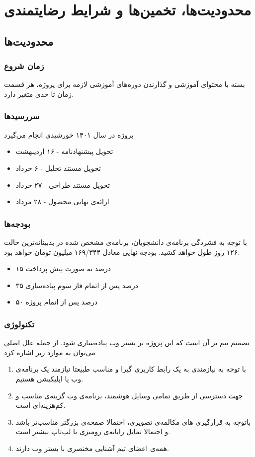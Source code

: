 \section{محدودیت‌ها، تخمین‌ها و شرایط رضایتمندی}

\subsection{محدودیت‌ها}
\subsubsection{زمان شروع}
بسته با محتوای آموزشی و گذارندن دوره‌های آموزشی لازمه برای پروژه، هر قسمت زمان تا حدی متغیر دارد.
\subsubsection{سررسید‌ها}
پروژه در سال ۱۴۰۱ خورشیدی انجام می‌گیرد
\begin{itemize}
    \item تحویل پیشنهادنامه - ۱۶ اردیبهشت
    \item تحویل مستند تحلیل - ۶ خرداد
    \item تحویل مستند طراحی - ۲۷ خرداد
    \item ارائه‌ی نهایی محصول - ۲۸ مرداد
\end{itemize}
\subsubsection{بودجه‌ها}
با توجه به فشردگی برنامه‌ی دانشجویان، برنامه‌ی مشخص شده در بدبینانه‌ترین حالت ۱۲۶ روز طول خواهد کشید. بودجه نهایی معادل ۱۶۹/۳۴۴ میلیون تومان خواهد بود.
\begin{itemize}
    \item ۱۵ درصد به صورت پیش پرداخت
    \item ۳۵ درصد پس از اتمام فاز سوم پیاده‌سازی
    \item ۵۰ درصد پس از اتمام پروژه
\end{itemize}
\subsubsection{تکنولوژی}
تصمیم تیم بر آن است که این پروژه بر بستر وب پیاده‌سازی شود. از جمله علل اصلی می‌توان به موارد زیر اشاره کرد
\begin{enumerate}
    \item با توجه به نیازمندی به یک رابط کاربری گیرا و مناسب طبیعتا نیازمند یک برنامه‌ی وب یا اپلیکیشن هستیم.
    \item جهت دسترسی از طریق تمامی وسایل هوشمند، برنامه‌ی وب گزینه‌ی مناسب و کم‌هزینه‌ای است.
    \item باتوجه به قرارگیری های مکالمه‌ی تصویری، احتمالا صفحه‌ی بزرگتر مناسب‌تر باشد و احتمالا تمایل رایانه‌ی رومیزی یا لپ‌تاپ بیشتر است.
    \item همه‌ی اعضای تیم آشنایی مختصری با بستر وب دارند.
\end{enumerate}

